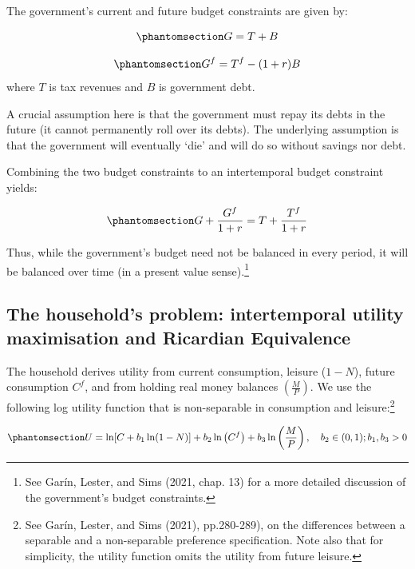 \documentclass[
  letterpaper,
  DIV=11,
  numbers=noendperiod]{scrreprt}
\begin{document}
The government's current and future budget constraints are given by:

\begin{equation}\phantomsection\label{eq-Gbc}{
G=T+B
}\end{equation}

\begin{equation}\phantomsection\label{eq-Gf}{
G^f=T^f-(1+r) B
}\end{equation} where \(T\) is tax revenues and \(B\) is government
debt.

A crucial assumption here is that the government must repay its debts in
the future (it cannot permanently roll over its debts). The underlying
assumption is that the government will eventually `die' and will do so
without savings nor debt.

Combining the two budget constraints to an intertemporal budget
constraint yields:

\begin{equation}\phantomsection\label{eq-Gitbc}{
G+\frac{G^f}{1+r}=T+\frac{T^f}{1+r}
}\end{equation}

Thus, while the government's budget need not be balanced in every
period, it will be balanced over time (in a present value
sense).\footnote{See Garín, Lester, and Sims (2021, chap. 13) for a more
  detailed discussion of the government's budget constraints.}

\subsection{The household's problem: intertemporal utility maximisation
and Ricardian
Equivalence}\label{the-households-problem-intertemporal-utility-maximisation-and-ricardian-equivalence}

The household derives utility from current consumption, leisure
(\(1-N\)), future consumption \(C^f\), and from holding real money
balances \(\left(\frac{M}{P}\right)\). We use the following log utility
function that is non-separable in consumption and leisure:\footnote{See
  Garín, Lester, and Sims (2021), pp.280-289), on the differences
  between a separable and a non-separable preference specification. Note
  also that for simplicity, the utility function omits the utility from
  future leisure.}

\begin{equation}\phantomsection\label{eq-U}{
U=\ln [C+ b_1 \ln (1-N)]+b_2 \ln \left(C^f\right)+b_3 \ln \left(\frac{M}{P}\right), \quad b_2\in (0,1); b_1, b_3>0
}\end{equation}
\end{document}
